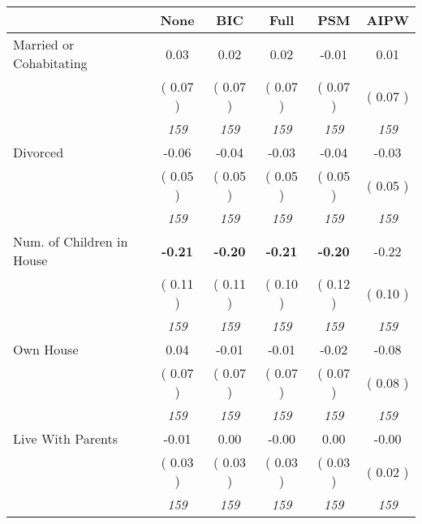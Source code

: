 \begin{tabular}{l c c c c c}
\toprule
 & None & BIC & Full & PSM & AIPW \\
\midrule
Married or Cohabitating &      0.03 &      0.02 &      0.02 &     -0.01 &      0.01 \\
& (     0.07 ) & (     0.07 ) & (     0.07 ) & (     0.07 ) & (     0.07 ) \\
& \textit{ 159 } & \textit{ 159 } & \textit{ 159 } & \textit{ 159 } & \textit{ 159 } \\
Divorced &     -0.06 &     -0.04 &     -0.03 &     -0.04 &     -0.03 \\
& (     0.05 ) & (     0.05 ) & (     0.05 ) & (     0.05 ) & (     0.05 ) \\
& \textit{ 159 } & \textit{ 159 } & \textit{ 159 } & \textit{ 159 } & \textit{ 159 } \\
Num. of Children in House & \textbf{     -0.21 } & \textbf{     -0.20 } & \textbf{     -0.21 } & \textbf{    -0.20} &     -0.22 \\
& (     0.11 ) & (     0.11 ) & (     0.10 ) & (     0.12 ) & (     0.10 ) \\
& \textit{ 159 } & \textit{ 159 } & \textit{ 159 } & \textit{ 159 } & \textit{ 159 } \\
Own House &      0.04 &     -0.01 &     -0.01 &     -0.02 &     -0.08 \\
& (     0.07 ) & (     0.07 ) & (     0.07 ) & (     0.07 ) & (     0.08 ) \\
& \textit{ 159 } & \textit{ 159 } & \textit{ 159 } & \textit{ 159 } & \textit{ 159 } \\
Live With Parents &     -0.01 &      0.00 &     -0.00 &      0.00 &     -0.00 \\
& (     0.03 ) & (     0.03 ) & (     0.03 ) & (     0.03 ) & (     0.02 ) \\
& \textit{ 159 } & \textit{ 159 } & \textit{ 159 } & \textit{ 159 } & \textit{ 159 } \\
\bottomrule
\end{tabular}
